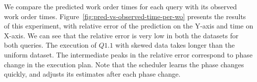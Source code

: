 We compare the predicted work order times for each query with its observed work order times. %
Figure~\ref{fig:pred-vs-observed-time-per-wo} presents the results of this experiment, with relative error of the prediction on the Y-axis and time on X-axis.
We can see that the relative error is very low in both the datasets for both queries. 
The execution of $Q1.1$ with skewed data takes longer than the uniform dataset.
The intermediate peaks in the relative error correspond to phase change in the execution plan. 
Note that the scheduler learns the phase changes quickly, and adjusts its estimates after each phase change. 

